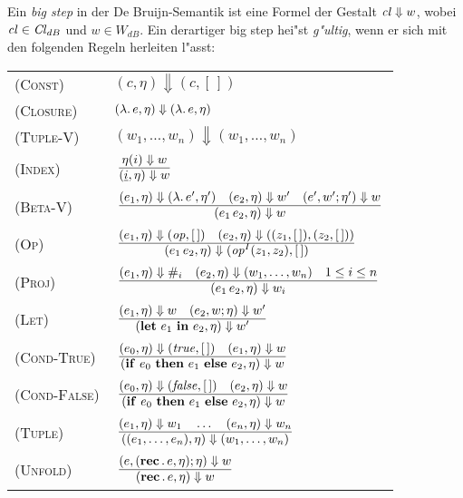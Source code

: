 \documentclass[12pt,fleqn,a4paper]{article}
\newcommand{\RN}[1]{\mbox{\textsc{(#1)}}}
\newcommand{\Cl}{\name{Cl}}
\newcommand{\cl}{\name{cl}}
\begin{document}
\begin{definition}
Ein {\em big step} in der De Bruijn-Semantik ist eine Formel der Gestalt $\cl \Downarrow w$,
wobei $\cl\in\Cl_{dB}$ und $w \in W_{dB}$. Ein derartiger big step hei"st {\em g"ultig}, wenn er
sich mit den folgenden Regeln herleiten l"asst: \\[5mm]
\begin{tabular}{ll}
  \RN{Const}      & $(c,\eta) \Downarrow (c,[\,])$ \\[1mm]
  \RN{Closure}    & $(\lambda .\,e,\eta) \Downarrow (\lambda .\,e,\eta)$ \\[1mm]
  \RN{Tuple-V}    & $(w_1,\ldots,w_n) \Downarrow (w_1,\ldots,w_n)$ \\[1mm]
  \RN{Index}      & $\regel{\eta(i) \Downarrow w}
                           {(\underline{i},\eta) \Downarrow w}$ \\[3mm]
  \RN{Beta-V}     & $\regel{(e_1,\eta) \Downarrow (\abstr{}{e'},\eta')
                            \quad (e_2,\eta) \Downarrow w'
                            \quad (e',w';\eta') \Downarrow w}
                           {(\app{e_1}{e_2},\eta) \Downarrow w}$ \\[3mm]
  \RN{Op}         & $\regel{(e_1,\eta) \Downarrow (\op,[\,]) \quad (e_2,\eta) \Downarrow ((z_1,[\,]),(z_2,[\,]))}
                           {(\app{e_1}{e_2},\eta) \Downarrow (\op^I(z_1,z_2),[\,])}$ \\[3mm]
  \RN{Proj}       & $\regel{(e_1,\eta) \Downarrow \proj{i}
                            \quad (e_2,\eta) \Downarrow (w_1,\ldots,w_n)
                            \quad 1 \le i \le n}
                           {(\app{e_1}{e_2},\eta) \Downarrow w_i}$ \\[3mm]
  \RN{Let}        & $\regel{(e_1,\eta) \Downarrow w \quad (e_2,w;\eta) \Downarrow w'}
                           {(\blidB{e_1}{e_2},\eta) \Downarrow w'}$ \\[3mm]
  \RN{Cond-True}  & $\regel{(e_0,\eta) \Downarrow (\true,[\,]) \quad (e_1,\eta) \Downarrow w}
                           {(\bifte{e_0}{e_1}{e_2},\eta) \Downarrow w}$ \\[3mm]
  \RN{Cond-False} & $\regel{(e_0,\eta) \Downarrow (\false,[\,]) \quad (e_2,\eta) \Downarrow w}
                           {(\bifte{e_0}{e_1}{e_2},\eta) \Downarrow w}$ \\[3mm]
  \RN{Tuple}      & $\regel{(e_1,\eta) \Downarrow w_1 \quad \ldots \quad (e_n,\eta) \Downarrow w_n}
                           {((e_1,\ldots,e_n),\eta) \Downarrow (w_1,\ldots,w_n)}$ \\[3mm]
  \RN{Unfold}     & $\regel{(e,(\rec{}{e},\eta);\eta) \Downarrow w}
                           {(\rec{}{e},\eta) \Downarrow w}$ \\[3mm]
\end{tabular}
\end{definition}
\end{document}
